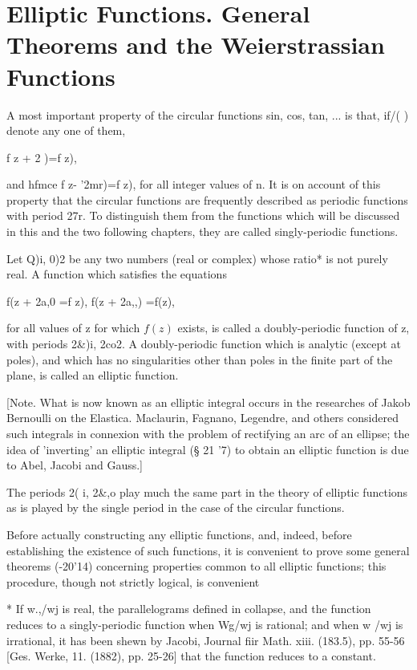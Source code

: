 %
%
\chapter{Elliptic Functions. General Theorems and the 
Weierstrassian Functions} 


A most important property of the circular functions sin, cos, tan,
... is that, if/( ) denote any one of them,

f z + 2 )=f z),

and hfmce f z- '2mr)=f z), for all integer values of n. It is on
account of this property that the circular functions are frequently
described as periodic functions with period 27r. To distinguish them
from the functions which will be discussed in this and the two
following chapters, they are called singly-periodic functions.

Let Q)i, 0)2 be any two numbers (real or complex) whose ratio* is not
purely real. A function which satisfies the equations

f(z + 2a,0 =f z), f(z + 2a,,) =f(z),

for all values of z for which $f(z)$ exists, is called a doubly-periodic
function of z, with periods 2\&)i, 2co2. A doubly-periodic function
which is analytic (except at poles), and which has no singularities
other than poles in the finite part of the plane, is called an
elliptic function.

[Note. What is now known as an elliptic integral occurs in the
researches of Jakob Bernoulli on the Elastica. Maclaurin, Fagnano,
Legendre, and others considered such integrals in connexion with the
problem of rectifying an arc of an ellipse; the idea of 'inverting'
an elliptic integral (§ 21 '7) to obtain an elliptic function is due
to Abel, Jacobi and Gauss.]

The periods 2( i, 2\&,o play much the same part in the theory of
elliptic functions as is played by the single period in the case of
the circular functions.

Before actually constructing any elliptic functions, and, indeed,
before establishing the existence of such functions, it is convenient
to prove some general theorems (-20'14) concerning properties
common to all elliptic functions; this procedure, though not strictly
logical, is convenient

* If w.,/wj is real, the parallelograms defined in collapse,
and the function reduces to a singly-periodic function when Wg/wj is
rational; and when w /wj is irrational, it has been shewn by Jacobi,
Journal fiir Math. xiii. (183.5), pp. 55-56 [Ges. Werke, 11. (1882),
pp. 25-26] that the function reduces to a constant.

